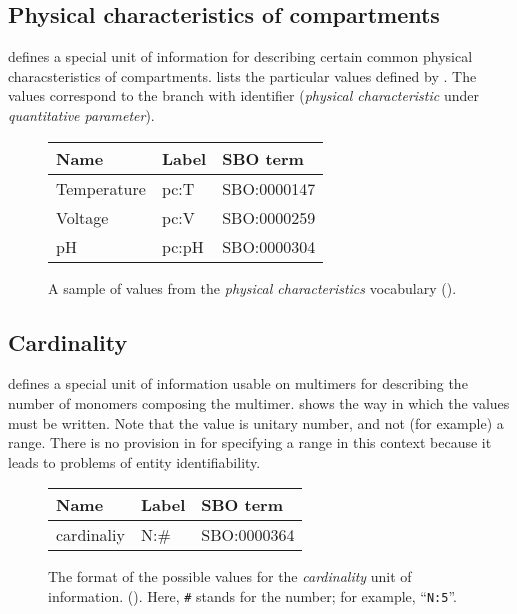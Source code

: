 \subsection{Physical characteristics of compartments}
\label{sec:physical-characteristics-cv}

\SBGNPDLone defines a special unit of information for describing certain common physical characsteristics of compartments.   lists the particular values defined by \SBGNPDLone.  The values correspond to the \sbo branch with identifier  (\emph{physical characteristic} under \emph{quantitative parameter}).

\begin{figure}[h]
  \centering
  \begin{tabular}{l>{\ttfamily}ll}
    \toprule
    \textbf{Name}   & \textbf{\rmfamily Label} & \textbf{SBO term} \\
    \midrule
    Temperature   & pc:T  & SBO:0000147\\
    Voltage       & pc:V  & SBO:0000259\\
    pH            & pc:pH & SBO:0000304\\
    \bottomrule
  \end{tabular}
  \caption{A sample of values from the \emph{physical
      characteristics} vocabulary ().}
  \label{fig:physical-characteristics-cv}
\end{figure}


\subsection{Cardinality}
\label{sec:cardinality-cv}

\SBGNPDLone defines a special unit of information usable on multimers for describing the number of monomers composing the multimer.   shows the way in which the values must be written.  Note that the value is unitary number, and not (for example) a range.  There is no provision in \SBGNPDLone for specifying a range in this context because it leads to problems of entity identifiability.

\begin{figure}[h]
  \centering
  \begin{tabular}{l>{\ttfamily}ll}
    \toprule
    \textbf{Name}   & \textbf{\rmfamily Label} & \textbf{SBO term} \\
    \midrule
    cardinaliy    & N:\#  & SBO:0000364\\
    \bottomrule
  \end{tabular}
  \caption{The format of the possible values for the
    \emph{cardinality} unit of information.
    ().  Here, \texttt{\#} stands for the
    number; for example, ``\texttt{N:5}''.}
  \label{fig:cardinality-cv}
\end{figure}





